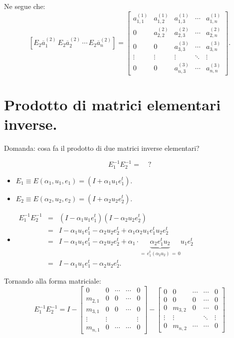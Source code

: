 \begin{dimo}
Ne segue che:
\[
\left[E_2\overline{a}_1^{(2)}\,E_2\overline{a}_2^{(2)}\,\cdots\,
E_2\overline{a}_n^{(2)}
\right] = \left[
\begin{array}{ccccc}
a_{1,1}^{(1)} & a_{1,2}^{(1)} & a_{1,3}^{(1)} & \cdots & a_{1,n}^{(1)} \\
0           & a_{2,2}^{(2)} & a_{2,3}^{(2)} & \cdots & a_{2,n}^{(2)} \\
0           & 0           & a_{3,3}^{(3)} & \cdots & a_{3,n}^{(3)} \\
\vdots      & \vdots      & \vdots      & \ddots & \vdots      \\
0           & 0           & a_{n,3}^{(3)} & \cdots & a_{n,n}^{(3)}
\end{array}\right].
\]

\end{dimo}

\section{Prodotto di matrici elementari inverse.}
Domanda: cosa fa il prodotto di due matrici inverse elementari?

\[E_1^{-1}E_2^{-1} =\quad ?\]
\begin{itemize}
\item[]$E_1 \equiv E(\alpha_1, u_1, e_1) = (I + \alpha_1u_1e_1^t).$
\item[]$E_2 \equiv E(\alpha_2, u_2, e_2) = (I + \alpha_2u_2e_2^t).$


\item[]$
\begin{array}{lcl}
E_1^{-1}E_2^{-1} & = & (I - \alpha_1u_1e_1^t)(I - \alpha_2u_2e_2^t) \\
& = & I - \alpha_1u_1e_1^t - \alpha_2u_2e_2^t +
\alpha_1\alpha_2u_1e_1^tu_2e_2^t\\
& = & I - \alpha_1u_1e_1^t - \alpha_2u_2e_2^t + \alpha_1\cdot
\underbrace{\alpha_2e_1^tu_2}_{=\,e_1^t(\alpha_2u_2)\, =\, 0 }u_1e_2^t\\
& = & I - \alpha_1u_1e_1^t - \alpha_2u_2e_2^t.
\end{array}$
\end{itemize}

Tornando alla forma matriciale:
\[
E_1^{-1}E_2^{-1}  = I - \left[\begin{array}{ccccc}
0 & 0 &\cdots  &\cdots & 0 \\
m_{2,1} & 0 & 0  & \cdots & 0 \\
m_{3,1} & 0 & 0  & \cdots & 0 \\
\vdots & \vdots & & &\vdots \\
m_{n,1} & 0 & \cdots &\cdots &0
\end{array}\right]
-
\left[\begin{array}{ccccc}
0 & 0 &\cdots  &\cdots & 0 \\
0  & 0 & 0  & \cdots & 0 \\
0 & m_{3,2} & 0  & \cdots & 0 \\
\vdots & \vdots  & &\ddots & \vdots\\
0 & m_{n,2}  & \cdots &\cdots &0
\end{array}\right]
\]

